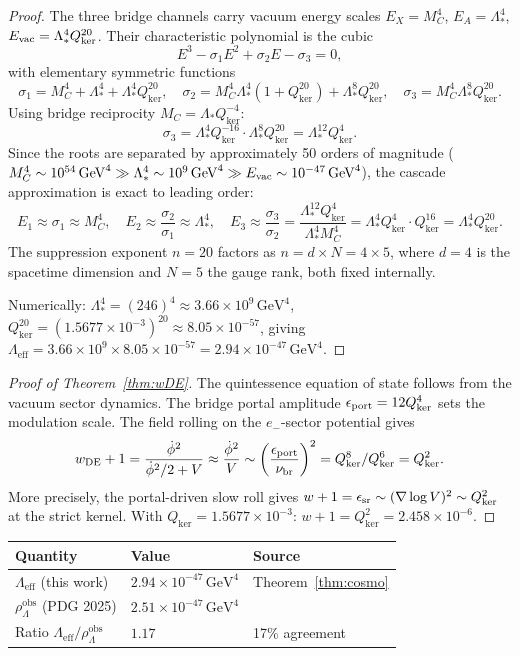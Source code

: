 \documentclass[12pt]{article}
\theoremstyle{plain}
\theoremstyle{definition}
\numberwithin{equation}{section}
\newcommand{\br}{\mathrm{br}}
\newcommand{\kker}{\mathrm{ker}}
\newcommand{\eff}{\mathrm{eff}}
\newcommand{\obs}{\mathrm{obs}}
\begin{document}
\begin{proof}
The three bridge channels carry vacuum energy scales
$E_X=M_C^4$, $E_A=\Lambda_*^4$, $E_{\rm vac}=\Lambda_*^4 Q_{\kker}^{20}$.
Their characteristic polynomial is the cubic
\[
E^3-\sigma_1 E^2+\sigma_2 E-\sigma_3=0,
\]
with elementary symmetric functions
\[
\sigma_1=M_C^4+\Lambda_*^4+\Lambda_*^4 Q_{\kker}^{20},\quad
\sigma_2=M_C^4\Lambda_*^4(1+Q_{\kker}^{20})+\Lambda_*^8 Q_{\kker}^{20},\quad
\sigma_3=M_C^4\Lambda_*^8 Q_{\kker}^{20}.
\]
Using bridge reciprocity $M_C=\Lambda_* Q_{\kker}^{-4}$:
\[
\sigma_3=\Lambda_*^4 Q_{\kker}^{-16}\cdot\Lambda_*^8 Q_{\kker}^{20}=\Lambda_*^{12}Q_{\kker}^4.
\]
Since the roots are separated by approximately 50 orders of magnitude
($M_C^4\sim10^{54}\,\mathrm{GeV}^4\gg\Lambda_*^4\sim10^9\,\mathrm{GeV}^4\gg E_{\rm vac}\sim10^{-47}\,\mathrm{GeV}^4$),
the cascade approximation is exact to leading order:
\[
E_1\approx\sigma_1\approx M_C^4,\quad
E_2\approx\frac{\sigma_2}{\sigma_1}\approx\Lambda_*^4,\quad
E_3\approx\frac{\sigma_3}{\sigma_2}=\frac{\Lambda_*^{12}Q_{\kker}^4}{\Lambda_*^4 M_C^4}
=\Lambda_*^4 Q_{\kker}^4\cdot Q_{\kker}^{16}=\Lambda_*^4 Q_{\kker}^{20}.
\]
The suppression exponent $n=20$ factors as $n=d\times N=4\times5$, where $d=4$ is the spacetime dimension and $N=5$ the gauge rank, both fixed internally.

Numerically: $\Lambda_*^4=(246)^4\approx3.66\times10^9\,\mathrm{GeV}^4$,
$Q_{\kker}^{20}=(1.5677\times10^{-3})^{20}\approx8.05\times10^{-57}$,
giving $\Lambda_\eff=3.66\times10^9\times8.05\times10^{-57}=2.94\times10^{-47}\,\mathrm{GeV}^4$.
\end{proof}

\begin{proof}[Proof of Theorem~\ref{thm:wDE}]
The quintessence equation of state follows from the vacuum sector dynamics.
The bridge portal amplitude $\epsilon_{\rm port}=12Q_{\kker}^4$ sets the modulation scale.
The field rolling on the $e_-$-sector potential gives
\[
w_{\rm DE}+1 = \frac{\dot\phi^2}{\dot\phi^2/2+V}\approx\frac{\dot\phi^2}{V}
\sim\left(\frac{\epsilon_{\rm port}}{\nu_\br}\right)^2 = Q_{\kker}^8/Q_{\kker}^6 = Q_{\kker}^2.
\]
More precisely, the portal-driven slow roll gives
$w+1=\epsilon_{\rm sr}\sim(\nabla\log V)^2\sim Q_{\kker}^2$ at the strict kernel.
With $Q_{\kker}=1.5677\times10^{-3}$: $w+1=Q_{\kker}^2=2.458\times10^{-6}$.
\end{proof}

\begin{center}
\begin{tabular}{lll}
\toprule
Quantity & Value & Source\\
\midrule
$\Lambda_\eff$ (this work) & $2.94\times10^{-47}\,\mathrm{GeV}^4$ & Theorem~\ref{thm:cosmo}\\
$\rho_\Lambda^{\obs}$ (PDG 2025) & $2.51\times10^{-47}\,\mathrm{GeV}^4$ & \cite{PDG2025}\\
Ratio $\Lambda_\eff/\rho_\Lambda^{\obs}$ & $1.17$ & 17\% agreement\\
\bottomrule
\end{tabular}
\end{center}
\end{document}
